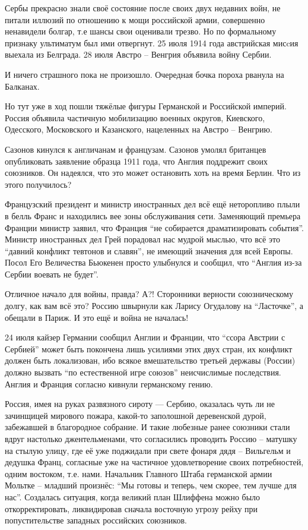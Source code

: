 Сербы прекрасно знали своё состояние после своих двух недавних войн, не питали
иллюзий по отношению к мощи российской армии, совершенно ненавидели болгар,
т.е шансы свои оценивали трезво. Но по формальному признаку ультиматум был ими
отвергнут. 25 июля 1914 года австрийская мисcия выехала из Белграда. 28 июля
Австро -- Венгрия объявила войну Сербии.

И ничего страшного пока не произошло. Очередная бочка пороха рванула на
Балканах.

Но тут уже в ход пошли тяжёлые фигуры Германской и Российской империй. Россия
объявила частичную мобилизацию военных округов, Киевского, Одесского,
Московского и Казанского, нацеленных на Австро -- Венгрию.

Сазонов кинулся к англичанам и французам. Сазонов умолял британцев опубликовать
заявление образца 1911 года, что Англия поддрежит своих союзников. Он надеялся,
что это может остановить хоть на время Берлин. Что из этого получилось?

Французский президент и министр иностранных дел всё ещё неторопливо плыли в
белль Франс и находились вее зоны обслуживания сети. Заменяющий премьера Франции
министр заявил, что Франция \enquote{не собирается драматизировать события}. Министр
иностранных дел Грей порадовал нас мудрой мыслью, что всё это \enquote{давний
конфликт тевтонов и славян}, не имеющий значения для всей Европы. Посол Его
Величества Бьюкенен просто улыбнулся и сообщил, что \enquote{Англия из-за
Сербии воевать не будет}.

Отличное начало для войны, правда? А?! Сторонники верности союзническому долгу,
как вам всё это? Россию швырнули как Ларису Огудалову на \enquote{Ласточке}, а обещали
в Париж. И это ещё и война не началась!

24 июля кайзер Германии сообщил Англии и Франции, что \enquote{ссора Австрии с
Сербией} может быть покончена лишь усилиями этих двух стран, их конфликт должен
быть локализован, ибо всякое вмешательство третьей державы (России) должно
вызвать \enquote{по естественной игре союзов} неисчислимые последствия. Англия и
Франция согласно кивнули германскому гению.

Россия, имея на руках развязного сироту --- Сербию, оказалась чуть ли не
зачинщицей мирового пожара, какой-то заполошной деревенской дурой, забежавшей
в благородное собрание. И такие любезные ранее союзники стали вдруг настолько
джентельменами, что согласились проводить Россию -- матушку на стылую улицу, где
её уже поджидали при свете фонаря дядя -- Вильгельм и дедушка Франц, согласные
уже на частичное удовлетворение своих потребностей, одним востоком, т.е. нами.
Начальник Главного Штаба германской армии Мольтке -- младший произнёс:
\enquote{Мы готовы и теперь, чем скорее, тем лучше для нас}. Создалась ситуация, когда
великий план Шлиффена можно было откорректировать, ликвидировав сначала
восточную угрозу рейху при попустительстве западных российских союзников.

